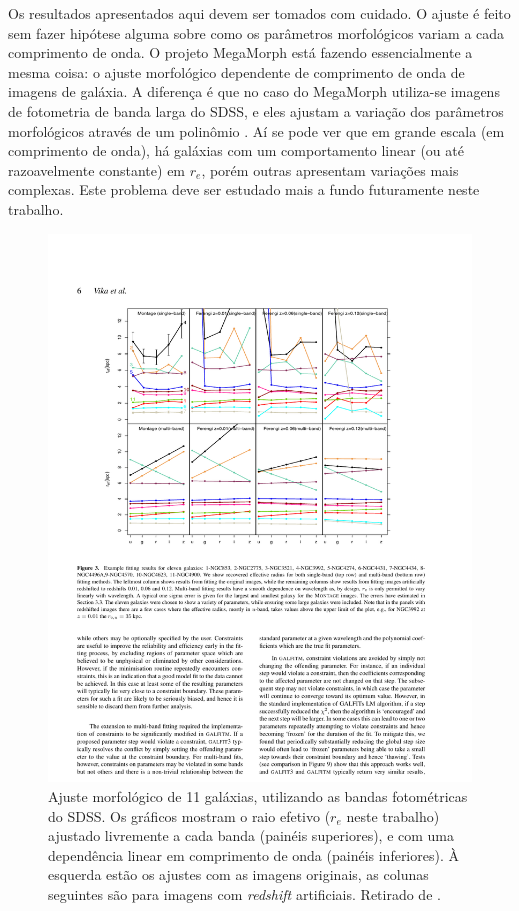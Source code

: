 Os resultados apresentados aqui devem ser tomados com cuidado. O ajuste é feito
sem fazer hipótese alguma sobre como os parâmetros morfológicos variam a cada
comprimento de onda. O projeto MegaMorph \citep{Haussler2013} está fazendo
essencialmente a mesma coisa: o ajuste morfológico dependente de comprimento de
onda de imagens de galáxia. A diferença é que no caso do MegaMorph utiliza-se
imagens de fotometria de banda larga do SDSS, e eles ajustam a variação dos
parâmetros morfológicos através de um polinômio \citep[Figura
\ref{fig:propertiesVika}]{Vika2013}. Aí se pode ver que em grande escala (em
comprimento de onda), há galáxias com um comportamento linear (ou até
razoavelmente constante) em $r_e$, porém outras apresentam variações mais
complexas. Este problema deve ser estudado mais a fundo futuramente neste
trabalho.

\begin{figure}
	\includegraphics{figuras/vika-properties}
	\caption[Ajuste morfológico de bandas fotométricas] {Ajuste
	morfológico de 11 galáxias, utilizando as bandas fotométricas do
	SDSS. Os gráficos mostram o raio efetivo ($r_e$ neste trabalho) ajustado
	livremente a cada banda (painéis superiores), e com uma dependência linear em
	comprimento de onda (painéis inferiores). À esquerda estão os ajustes com as
	imagens originais, as colunas seguintes são para imagens com {\em redshift}
	artificiais. Retirado de \citet{Vika2013}.}
	\label{fig:propertiesVika}
\end{figure}

